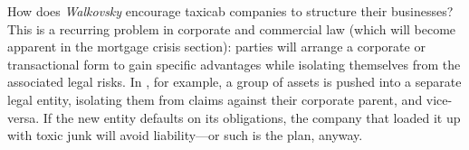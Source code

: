 \item How does \textit{Walkovsky} encourage taxicab companies to structure their
businesses? This is a recurring problem in corporate and commercial law (which
will become apparent in the mortgage crisis section): parties will arrange a
corporate or transactional form to gain specific advantages while isolating
themselves from the associated legal risks. In , for
example, a
group of assets is pushed into a separate legal entity, isolating them from
claims against their corporate parent, and vice-versa. If the new entity
defaults on its obligations, the company that loaded it up with toxic junk will
avoid liability---or such is the plan, anyway.

